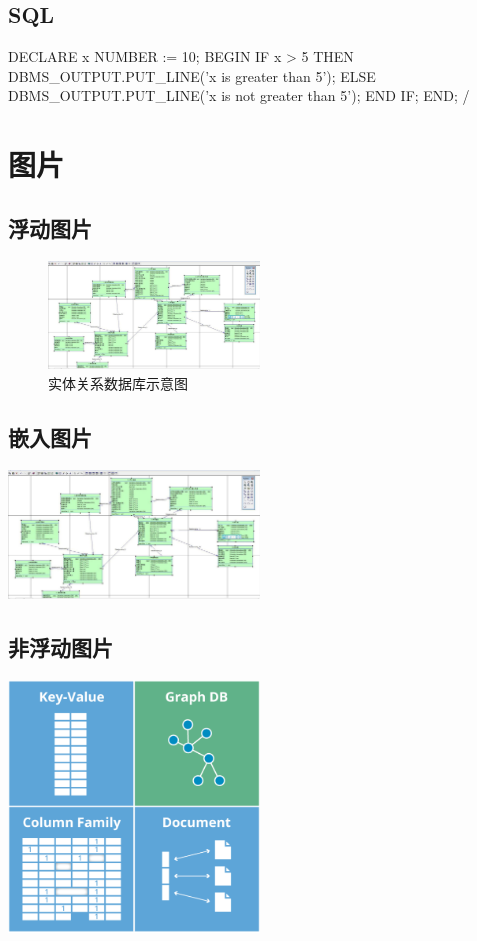\documentclass[11pt, a4paper, oneside]{ctexbook}
\begin{document}
\section{SQL}
\begin{plsql}[caption=PL/SQL程序1]
    DECLARE
    x NUMBER := 10;
    BEGIN
    IF x > 5 THEN
    DBMS_OUTPUT.PUT_LINE('x is greater than 5');
    ELSE
    DBMS_OUTPUT.PUT_LINE('x is not greater than 5');
    END IF;
    END;
    /
\end{plsql}

\chapter{图片}
\section{浮动图片}
\begin{figure}[htbp]
  \center
  \includegraphics[width=0.5\textwidth]{picture/实体关系数据库示意图.png}
  \caption{实体关系数据库示意图}
  \label{fig:relationDatabase}
\end{figure}
\section{嵌入图片}
\includegraphics[width=0.5\textwidth]{picture/实体关系数据库示意图.png}
\section{非浮动图片}
\begin{center}
  \begin{minipage}{0.99\textwidth}
    \center
    \includegraphics[width=0.5\textwidth]{picture/NoSQL数据库示意图.png}
    \captionsetup{hypcap=false}
    \label{fig:NosqlDatabase}
  \end{minipage}
\end{center}
\end{document}
